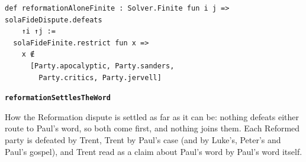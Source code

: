 \documentclass[11pt]{article}
\begin{document}
{\small\begin{verbatim}
def reformationAloneFinite : Solver.Finite fun i j => solaFideDispute.defeats
    ↑i ↑j :=
  solaFideFinite.restrict fun x =>
    x ∉
      [Party.apocalyptic, Party.sanders,
        Party.critics, Party.jervell]
\end{verbatim}}
\par\medskip\noindent\textbf{\texttt{reformation\allowbreak{}Settles\allowbreak{}The\allowbreak{}Word}}\par\nobreak\noindent
How the Reformation dispute is settled as far as it can be: nothing defeats either route to Paul's word, so both come first, and nothing joins them. Each Reformed party is defeated by Trent, Trent by Paul's case (and by Luke's, Peter's and Paul's gospel), and Trent read as a claim about Paul's word by Paul's word itself.
\end{document}

